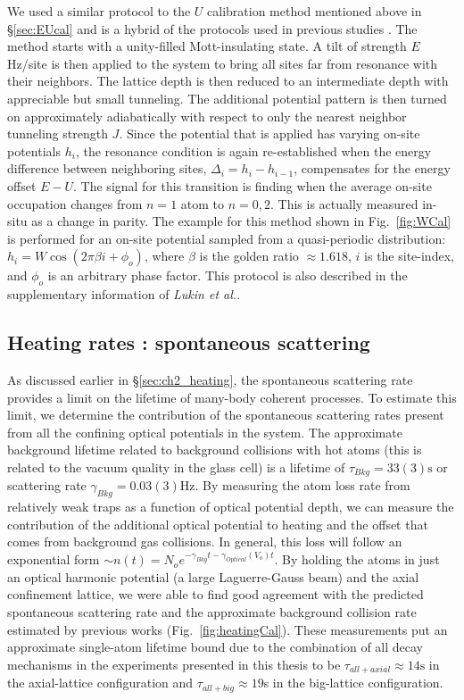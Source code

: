 We used a similar protocol to the $U$ calibration method mentioned above in \S \ref{sec:EUcal} and is a hybrid of the protocols used in previous studies \cite{Ma2011,Simon2011}. The method starts with a unity-filled Mott-insulating state. A tilt of strength $E$ Hz/site is then applied to the system to bring all sites far from resonance with their neighbors. The lattice depth is then reduced to an intermediate depth with appreciable but small tunneling. The additional potential pattern is then turned on approximately adiabatically with respect to only the nearest neighbor tunneling strength $J$. Since the potential that is applied has varying on-site potentials $h_i$, the resonance condition is again re-established when the energy difference between neighboring sites, $\Delta_i = h_i - h_{i-1}$, compensates for the energy offset $E-U$. The signal for this transition is finding when the average on-site occupation changes from $n=1$ atom to $n=0,2$. This is actually measured in-situ as a change in parity. The example for this method shown in Fig.~\ref{fig:WCal} is performed for an on-site potential sampled from a quasi-periodic distribution: $h_i = W \cos{\left (  2 \pi \beta i + \phi_o \right ) }$, where $\beta$ is the golden ratio $\approx 1.618$, $i$ is the site-index, and $\phi_o$ is an arbitrary phase factor. This protocol is also described in the supplementary information of \emph{Lukin et al.}\cite{Lukin2019}.

\subsection{Heating rates : spontaneous scattering}

As discussed earlier in \S \ref{sec:ch2_heating}, the spontaneous scattering rate provides a limit on the lifetime of many-body coherent processes. To estimate this limit, we determine the contribution of the spontaneous scattering rates present from all the confining optical potentials in the system. The approximate background lifetime related to background collisions with hot atoms (this is related to the vacuum quality in the glass cell) is a lifetime of $\tau_{Bkg} = 33(3)\mathrm{s}$ or scattering rate $\gamma_{Bkg} = 0.03(3)\mathrm{Hz}$. By measuring the atom loss rate from relatively weak traps as a function of optical potential depth, we can measure the contribution of the additional optical potential to heating and the offset that comes from background gas collisions. In general, this loss will follow an exponential form $\sim n(t) = N_o e^{-\gamma_{Bkg} t - \gamma_{Optical}(V_o) t}$. By holding the atoms in just an optical harmonic potential (a large Laguerre-Gauss beam) and the axial confinement lattice, we were able to find good agreement with the predicted spontaneous scattering rate and the approximate background collision rate estimated by previous works (Fig.~\ref{fig:heatingCal})\cite{Gillen2009,Bakr2011,Preiss2015}. These measurements put an approximate single-atom lifetime bound due to the combination of all decay mechanisms in the experiments presented in this thesis to be $\tau_{all+axial} \approx 14\mathrm{s}$ in the axial-lattice configuration and $\tau_{all+big} \approx 19$s in the big-lattice configuration.

